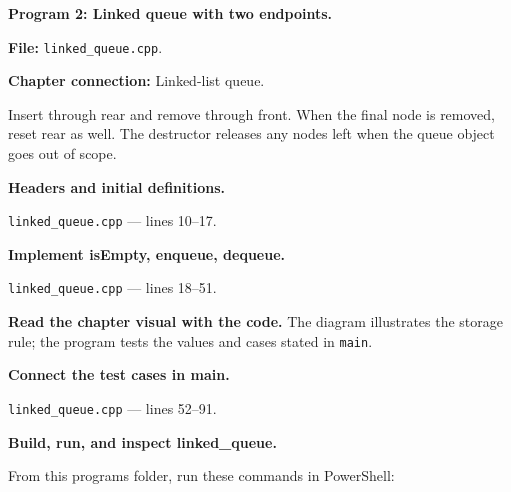 \textbf{Program 2: Linked queue with two endpoints.}

\textbf{File:} \texttt{linked\_queue.cpp}.

\textbf{Chapter connection:} Linked-list queue.

Insert through rear and remove through front. When the final node is removed, reset rear as well. The destructor releases any nodes left when the queue object goes out of scope.



\begin{utpsteps}\setcounter{enumi}{0}\item \textbf{Headers and initial definitions.}\end{utpsteps}

\texttt{linked\_queue.cpp} --- lines 10--17.




\tcbbreak

\begin{utpsteps}\setcounter{enumi}{1}\item \textbf{Implement isEmpty, enqueue, dequeue.}\end{utpsteps}

\texttt{linked\_queue.cpp} --- lines 18--51.

\textbf{Read the chapter visual with the code.} The diagram illustrates the storage rule; the program tests the values and cases stated in \texttt{main}.





\tcbbreak

\begin{utpsteps}\setcounter{enumi}{2}\item \textbf{Connect the test cases in main.}\end{utpsteps}

\texttt{linked\_queue.cpp} --- lines 52--91.






\tcbbreak

\textbf{Build, run, and inspect linked\_queue.}

From this program\textquotesingle s folder, run these commands in PowerShell:

